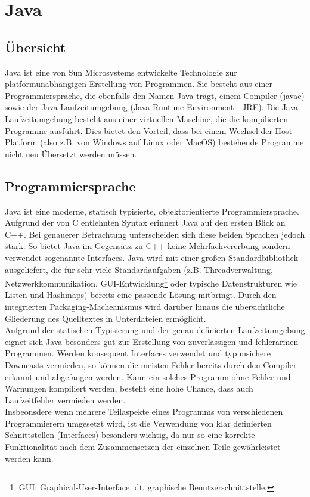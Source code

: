 \section{Java}
    \subsection{Übersicht}

        Java ist eine von Sun Microsystems entwickelte Technologie zur platformunabhängigen 
        Erstellung von Programmen. Sie besteht aus einer Programmiersprache, die ebenfalls den Namen
        Java trägt, einem Compiler (javac) sowie der Java-Laufzeitumgebung (Java-Runtime-Environment - JRE).
        Die Java-Laufzeitumgebung besteht aus einer virtuellen Maschine, die die kompilierten Programme ausführt.
        Dies bietet den Vorteil, dass bei einem Wechsel der Host-Platform (also z.B. von Windows auf Linux oder MacOS) 
        bestehende Programme nicht neu Übersetzt werden müssen.\\

    \subsection{Programmiersprache}
        Java ist eine moderne, statisch typisierte, objektorientierte Programmiersprache. Aufgrund der von C entlehnten 
        Syntax erinnert Java auf den ersten Blick an C++. Bei genauerer Betrachtung unterscheiden sich diese beiden 
        Sprachen jedoch stark. So bietet Java im Gegensatz zu C++ keine Mehrfachvererbung sondern verwendet sogenannte
        Interfaces. Java wird mit einer großen Standardbibliothek ausgeliefert, die für sehr viele Standardaufgaben
        (z.B. Threadverwaltung, Netzwerkkommunikation, GUI-Entwicklung\footnote{GUI: Graphical-User-Interface, dt. 
        graphische Benutzerschnittstelle.} oder typische Datenstrukturen wie Listen und Hashmaps) bereits eine
        passende Lösung mitbringt. Durch den integrierten Packaging-Macheanismus wird darüber hinaus die übersichtliche
        Gliederung des Quelltextes in Unterdateien ermöglicht.\\
        Aufgrund der statischen Typisierung und der genau definierten Laufzeitumgebung eignet sich Java besonders
        gut zur Erstellung von zuverlässigen und fehlerarmen Programmen. Werden konsequent Interfaces verwendet und
        typunsichere Downcasts vermieden, so können die meisten Fehler bereits durch den Compiler erkannt und abgefangen 
        werden. Kann ein solches Programm ohne Fehler und Warnungen kompiliert werden, besteht eine hohe Chance,
        dass auch Laufzeitfehler vermieden werden.\\
        Insbeonsdere wenn mehrere Teilaspekte eines Programms von verschiedenen Programmierern umgesetzt wird, 
        ist die Verwendung von klar definierten Schnittstellen (Interfaces) besonders wichtig, da nur so eine korrekte
        Funktionalität nach dem Zusammensetzen der einzelnen Teile gewährleistet werden kann.

